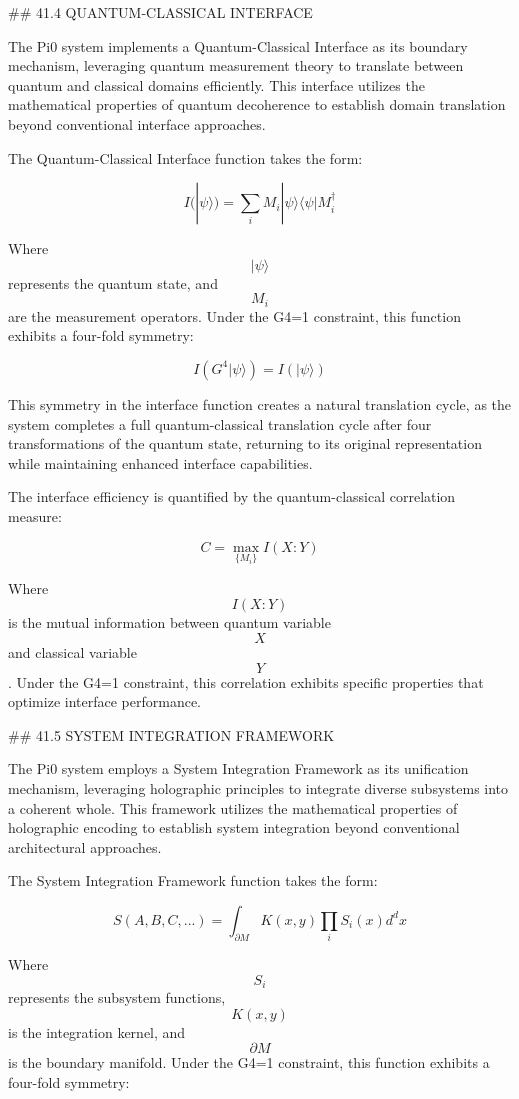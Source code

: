 ## 41.4 QUANTUM-CLASSICAL INTERFACE

The Pi0 system implements a Quantum-Classical Interface as its boundary mechanism, leveraging quantum measurement theory to translate between quantum and classical domains efficiently. This interface utilizes the mathematical properties of quantum decoherence to establish domain translation beyond conventional interface approaches.

The Quantum-Classical Interface function takes the form:

$$ I(|\psi\rangle) = \sum_i M_i |\psi\rangle \langle\psi| M_i^\dagger $$

Where $$ |\psi\rangle $$ represents the quantum state, and $$ M_i $$ are the measurement operators. Under the G4=1 constraint, this function exhibits a four-fold symmetry:

$$ I(G^4 |\psi\rangle) = I(|\psi\rangle) $$

This symmetry in the interface function creates a natural translation cycle, as the system completes a full quantum-classical translation cycle after four transformations of the quantum state, returning to its original representation while maintaining enhanced interface capabilities.

The interface efficiency is quantified by the quantum-classical correlation measure:

$$ C = \max_{\{M_i\}} I(X:Y) $$

Where $$ I(X:Y) $$ is the mutual information between quantum variable $$ X $$ and classical variable $$ Y $$. Under the G4=1 constraint, this correlation exhibits specific properties that optimize interface performance.

## 41.5 SYSTEM INTEGRATION FRAMEWORK

The Pi0 system employs a System Integration Framework as its unification mechanism, leveraging holographic principles to integrate diverse subsystems into a coherent whole. This framework utilizes the mathematical properties of holographic encoding to establish system integration beyond conventional architectural approaches.

The System Integration Framework function takes the form:

$$ S(A, B, C, ...) = \int_{\partial M} K(x, y) \prod_i S_i(x) d^dx $$

Where $$ S_i $$ represents the subsystem functions, $$ K(x, y) $$ is the integration kernel, and $$ \partial M $$ is the boundary manifold. Under the G4=1 constraint, this function exhibits a four-fold symmetry:

